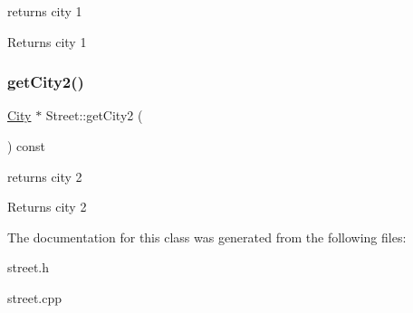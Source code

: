 returns city 1 

\begin{DoxyReturn}{Returns}
city 1 
\end{DoxyReturn}
\mbox{\label{class_street_af0c8600437fb78a5def8793544970c8c}} 
\subsubsection{\texorpdfstring{get\+City2()}{getCity2()}}
{\footnotesize\ttfamily \hyperlink{class_city}{City} $\ast$ Street\+::get\+City2 (\begin{DoxyParamCaption}{ }\end{DoxyParamCaption}) const}



returns city 2 

\begin{DoxyReturn}{Returns}
city 2 
\end{DoxyReturn}


The documentation for this class was generated from the following files\+:\begin{DoxyCompactItemize}
\item 
street.\+h\item 
street.\+cpp\end{DoxyCompactItemize}
